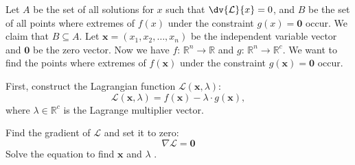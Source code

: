\documentclass[a4paper,12pt]{report}
\begin{document}
 Let $A$ be the set of all solutions for \( x \) such that $\dv{\mathcal{L}}{x} = 0$, and $B$ be the set of all points where extremes of \( f(x) \) under the constraint \( g(x) = \mathbf{0} \) occur. We claim that $B\subseteq A$.
Let \( \mathbf{x} = (x_1, x_2, \dots, x_n) \) be the independent variable vector and $\mathbf{0}$ be the zero vector. Now we have $f:\,\mathbb{R}^n \rightarrow \mathbb{R}$ and $g:\,\mathbb{R}^n \rightarrow \mathbb{R}^c$. We want to find the points where extremes of \( f(\mathbf{x}) \) under the constraint \( g(\mathbf{x}) = \mathbf{0}\) occur. 

First, construct the Lagrangian function \( \mathcal{L}(\mathbf{x},\lambda) \):
\[
\mathcal{L}(\mathbf{x},\lambda) = f(\mathbf{x}) - \lambda \cdot g(\mathbf{x}),
\]
where \( \lambda\in\mathbb{R}^c \) is the Lagrange multiplier vector.

Find the gradient of $\mathcal{L}$ and set it to zero:
\[
\nabla \mathcal{L} = \mathbf{0}
\]
Solve the equation to find \( \mathbf{x} \) and \( \lambda \) . 
\end{document}
